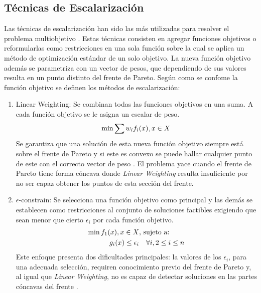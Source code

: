 \subsection{T\'ecnicas de Escalarizaci\'on }

Las t\'ecnicas de escalarizaci\'on han sido las m\'as utilizadas para resolver el problema multiobjetivo . Estas t\'ecnicas consisten en agregar funciones objetivos o  reformularlas como restricciones en una sola funci\'on sobre la cual se aplica un m\'etodo de optimizaci\'on est\'andar de un solo objetivo. La nueva funci\'on objetivo adem\'as se parametriza con un vector de pesos, que dependiendo de sus valores resulta en un punto distinto del frente de Pareto. Seg\'un como se confome la funci\'on objetivo se definen los m\'etodos de escalarizaci\'on:
\begin{enumerate}
    \item Linear Weighting: Se combinan todas las funciones objetivos en una suma. A cada funci\'on objetivo se le asigna un escalar de peso.
    \begin{equation*}
        \min \sum w_i f_i(x), \space x \in X
    \end{equation*}
    Se garantiza que una soluci\'on de esta nueva funci\'on objetivo siempre est\'a sobre el frente de Pareto  y si este es convexo se puede hallar cualquier punto de este con el correcto vector de peso . El problema yace cuando el frente de Pareto tiene forma c\'oncava donde \textit{Linear Weighting} resulta insuficiente por no ser capaz obtener los puntos de esta secci\'on del frente.

    \item $\epsilon$-constrain: Se selecciona una funci\'on objetivo como principal y las dem\'as se establecen como restricciones al conjunto de soluciones factibles exigiendo que sean menor que cierto $\epsilon_i$  por cada funci\'on objetivo.
    \begin{align*}
            \min  f_1(x), \space x \in X  & \text{, sujeto a:}   \\
            g_i(x) \leq \epsilon_i & \quad  \forall i, 2 \leq i \leq n
    \end{align*}
    Este enfoque presenta dos dificultades principales: la valores de los $\epsilon_i$, para una adecuada selecci\'on, requiren conocimiento previo del frente de Pareto y, al igual que \textit{Linear Weighting}, no es capaz de detectar soluciones en las partes c\'oncavas del frente .


\end{enumerate}
